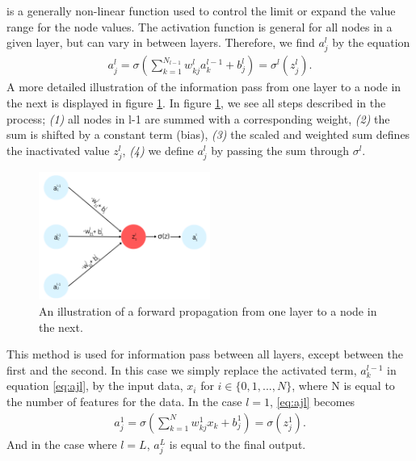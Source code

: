 is a generally non-linear function used to control the limit or expand the value range for the node values. The activation 
function is general for all nodes in a given layer, but can vary in between layers. Therefore,
we find $a_j^l$ by the equation
\begin{align}\label{eq:ajl}
    a_j^l = \sigma \left (\sum_{k=1} ^ {N_{l-1}} w_{kj}^la_k^{l-1} + b^l_j\right ) = \sigma^l(z_j^l).
\end{align}
A more detailed illustration of the information pass from one layer to a node in the next is displayed 
in figure \ref{fig:WB}. In figure \ref{fig:WB}, we see all steps described in the process; \emph{(1)} all nodes in 
l-1 are summed with a corresponding weight, \emph{(2)} the sum is shifted by a constant term (bias), \emph{(3)} the 
scaled and weighted sum defines the inactivated value $z_j^l$, \emph{(4)} we define $a^l_j$ by passing the 
sum through $\sigma^l$.  
\begin{figure}
    \centering
    \includegraphics[width=0.5\textwidth]{Figures/Illustrations/WeightBias.png}
    \caption{An illustration of a forward propagation from one layer to a node in the next.}
    \label{fig:WB}
\end{figure}
This method is used for information pass between all layers, except between the first and the second. 
In this case we simply replace the activated term, $a_k^{l-1}$ in equation \ref{eq:ajl}, by the input data,
$x_i$ for $i\in\{0,1,...,N\}$, where N is equal to the number of features for the data. In the case $l=1$, \ref{eq:ajl} 
becomes
\begin{align}
    a_j^1 = \sigma \left (\sum_{k=1} ^ {N} w_{kj}^1x_k + b^1_j\right ) = \sigma(z_j^1).
\end{align}
And in the case where $l=L$, $a_j^L$ is equal to the final output. 
